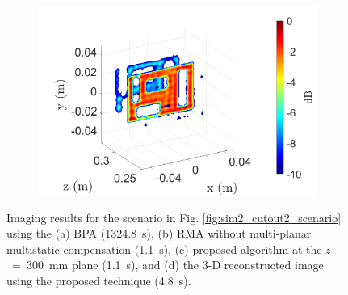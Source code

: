 \documentclass{ieeeaccess}
\begin{document}
\begin{figure}[h]
\begin{subfigure}[b]{0.23\textwidth}
         \caption{}
         \label{fig:sim2_cutout2_RMA_FFH}
    \end{subfigure}
    \hfill
    \begin{subfigure}[b]{0.23\textwidth}
         \centering
         \includegraphics[width=\textwidth]{smith15.png}
         \caption{}
         \label{fig:sim2_cutout2_RMA_FFH_3D}
    \end{subfigure}
\caption{Imaging results for the scenario in Fig. \ref{fig:sim2_cutout2_scenario} using the (a) BPA \mbox{(1324.8 s)}, (b) RMA without multi-planar multistatic compensation \mbox{(1.1 s)}, (c) proposed algorithm at the \mbox{$z$ = 300 mm} plane \mbox{(1.1 s)}, and (d) the \mbox{3-D} reconstructed image using the proposed technique \mbox{(4.8 s)}.}
\label{fig:sim2_cutout2}
\end{figure}
\end{document}
